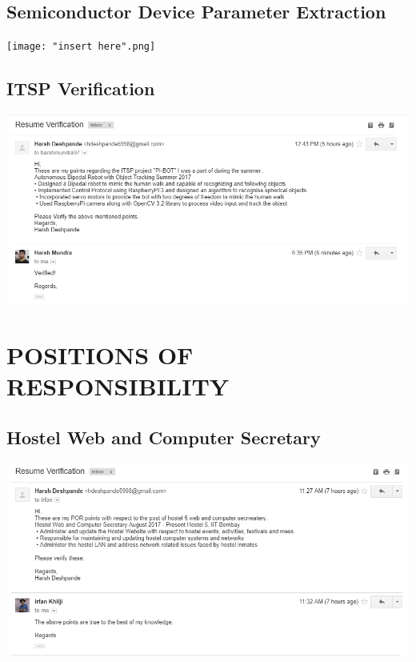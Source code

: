 \documentclass{article}
\begin{document}
	\subsection{Semiconductor Device Parameter Extraction}
\begin{center}
\vspace{20pt}
	\texttt{[image: "insert here".png]}{\centering}
\end{center}
	\subsection{ITSP Verification}
\begin{center}
\vspace{20pt}
	\includegraphics[width = 1.1\textwidth]{pro/ITSP.png}{\centering}
\end{center}
\newpage
\section{POSITIONS OF RESPONSIBILITY}
	\subsection{Hostel Web and Computer Secretary}
\begin{center}
	\includegraphics[width = 1.1\textwidth]{pro/por.png}{\centering}
\end{center}
\end{document}
